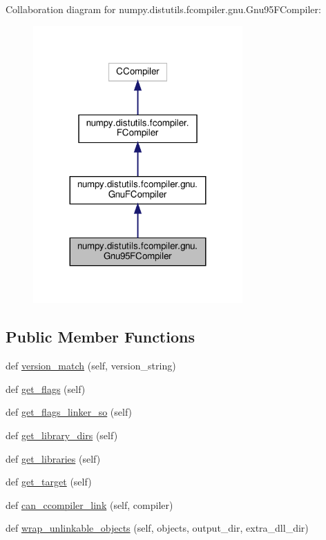 Collaboration diagram for numpy.\+distutils.\+fcompiler.\+gnu.\+Gnu95\+F\+Compiler\+:
\nopagebreak
\begin{figure}[H]
\begin{center}
\leavevmode
\includegraphics[width=227pt]{classnumpy_1_1distutils_1_1fcompiler_1_1gnu_1_1Gnu95FCompiler__coll__graph}
\end{center}
\end{figure}
\subsection*{Public Member Functions}
\begin{DoxyCompactItemize}
\item 
def \hyperlink{classnumpy_1_1distutils_1_1fcompiler_1_1gnu_1_1Gnu95FCompiler_a44e805118d764d1a1ba14d976bef55f0}{version\+\_\+match} (self, version\+\_\+string)
\item 
def \hyperlink{classnumpy_1_1distutils_1_1fcompiler_1_1gnu_1_1Gnu95FCompiler_a9244bdb2b7bc2cd01b47f3091a6f90a1}{get\+\_\+flags} (self)
\item 
def \hyperlink{classnumpy_1_1distutils_1_1fcompiler_1_1gnu_1_1Gnu95FCompiler_a6262b2d66aa36ee8d18e340aa15b7609}{get\+\_\+flags\+\_\+linker\+\_\+so} (self)
\item 
def \hyperlink{classnumpy_1_1distutils_1_1fcompiler_1_1gnu_1_1Gnu95FCompiler_a33e4b41761b6c867185e7a2e9d0047f8}{get\+\_\+library\+\_\+dirs} (self)
\item 
def \hyperlink{classnumpy_1_1distutils_1_1fcompiler_1_1gnu_1_1Gnu95FCompiler_a52de90c246080d6c8ab6bd922a1ce8d6}{get\+\_\+libraries} (self)
\item 
def \hyperlink{classnumpy_1_1distutils_1_1fcompiler_1_1gnu_1_1Gnu95FCompiler_a734e122157747f76e9a9393af29b7cdb}{get\+\_\+target} (self)
\item 
def \hyperlink{classnumpy_1_1distutils_1_1fcompiler_1_1gnu_1_1Gnu95FCompiler_a1881a199376a5f4f4371b479dece5aa6}{can\+\_\+ccompiler\+\_\+link} (self, compiler)
\item 
def \hyperlink{classnumpy_1_1distutils_1_1fcompiler_1_1gnu_1_1Gnu95FCompiler_ad48fc136778e39418bde7924e74ac0c3}{wrap\+\_\+unlinkable\+\_\+objects} (self, objects, output\+\_\+dir, extra\+\_\+dll\+\_\+dir)
\end{DoxyCompactItemize}
